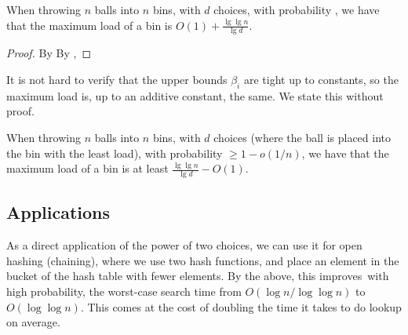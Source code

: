 \begin{theorem}
    When throwing $n$ balls into $n$ bins, with $d$ choices, with
    probability , we have that the maximum load of
    a bin is $O(1) + \tfrac{\lg \lg n}{\lg d}$.
\end{theorem}
\begin{proof}
    By   By
    , 
\end{proof}

It is not hard to verify that the upper bounds $\beta_i$ are tight up to
constants, so the maximum load is, up to an additive constant, the
same. We state this without proof.

\begin{theorem}
    When throwing $n$ balls into $n$ bins, with $d$ choices (where the
    ball is placed into the bin with the least load), with probability
    $\geq 1-o(1/n)$, we have that the maximum load of a bin is at
    least $\tfrac{\lg \lg n}{\lg d} - O(1)$.
\end{theorem}

\subsection{Applications}

As a direct application of the power of two choices, we can use it for
open hashing (chaining), where we use two hash functions, and place an
element in the bucket of the hash table with fewer elements. By the
above, this improves\, with high probability, the worst-case search time
from $O( \log n / \log \log n)$ to $O( \log \log n)$. This comes at the
cost of doubling the time it takes to do lookup on average.



